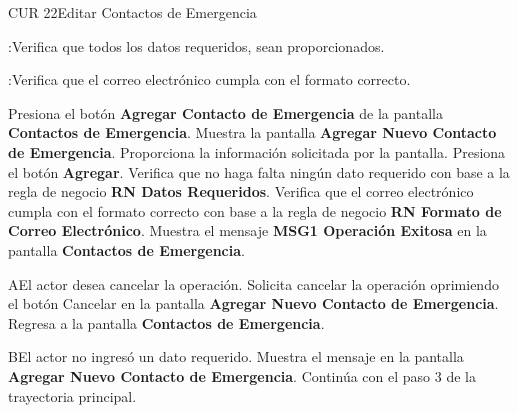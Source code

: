 \begin{UseCase}{CUR 22}{Editar Contactos de Emergencia}
{            
            :Verifica que todos los datos requeridos, sean proporcionados.
            
            :Verifica que el correo electrónico cumpla con el formato correcto.
    }
 \end{UseCase}

 \begin{UCtrayectoria}
 	
 	\UCpaso [\UCactor] Presiona el botón \textbf{Agregar Contacto de Emergencia} de la pantalla \textbf{Contactos de Emergencia}.
 	\UCpaso Muestra la pantalla \textbf{Agregar Nuevo Contacto de Emergencia}.
 	\UCpaso [\UCactor] Proporciona la información solicitada por la pantalla.
 	\UCpaso [\UCactor] Presiona el botón \textbf{Agregar}.
	\UCpaso Verifica que no haga falta ningún dato requerido con base a la regla de negocio \textbf{RN Datos Requeridos}.
	\UCpaso Verifica que el correo electrónico cumpla con el formato correcto con base a la regla de negocio \textbf{RN Formato de Correo Electrónico}.
	\UCpaso Muestra el mensaje \textbf{MSG1 Operación Exitosa} en la pantalla \textbf{Contactos de Emergencia}.
    
 \end{UCtrayectoria}

 \begin{UCtrayectoriaA}{A}{El actor desea cancelar la operación.}
    \UCpaso[\UCactor] Solicita cancelar la operación oprimiendo el botón Cancelar en la pantalla \textbf{Agregar Nuevo Contacto de Emergencia}.
   \UCpaso Regresa a la pantalla \textbf{Contactos de Emergencia}.
 \end{UCtrayectoriaA}
 
 \begin{UCtrayectoriaA}{B}{El actor no ingresó un dato requerido.}
    \UCpaso[\UCsist] Muestra el mensaje  en la pantalla \textbf{Agregar Nuevo Contacto de Emergencia}.
    \UCpaso[] Continúa con el paso 3 de la trayectoria principal.
 \end{UCtrayectoriaA}
 
